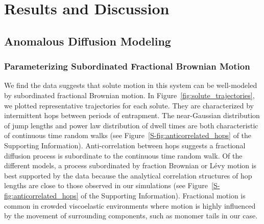 \documentclass[journal=jctcce,manuscript=article]{achemso}
\begin{document}
  \section{Results and Discussion}
  
  \subsection{Anomalous Diffusion Modeling}\label{section:sFBM}
  
  \subsubsection{Parameterizing Subordinated Fractional Brownian Motion}\label{section:AD_parameterization}

  We find the data suggests that solute motion in this system can be
  well-modeled by subordinated fractional Brownian motion. In
  Figure~\ref{fig:solute_trajectories}, we plotted representative trajectories
  for each solute. They are characterized by intermittent hops between periods
  of entrapment. The near-Gaussian distribution of jump lengths and power law
  distribution of dwell times are both characteristic of continuous time random
  walks (see Figure~\ref{S-fig:anticorrelated_hops} of the Supporting Information). 
  Anti-correlation between hops suggests a fractional diffusion process is 
  subordinate to the continuous time random walk. Of the different models, a 
  process subordinated by fraction Brownian or L\'evy motion is best supported by 
  the data because the analytical correlation structures of hop lengths are close
  to those observed in our simulations (see Figure~\ref{S-fig:anticorrelated_hops}
  of the Supporting Information). Fractional motion is common in crowded 
  viscoelastic environments where motion is highly influenced by the movement of 
  surrounding components, such as monomer tails in our case.~\cite{ernst_fractional_2012}
  
\end{document}
